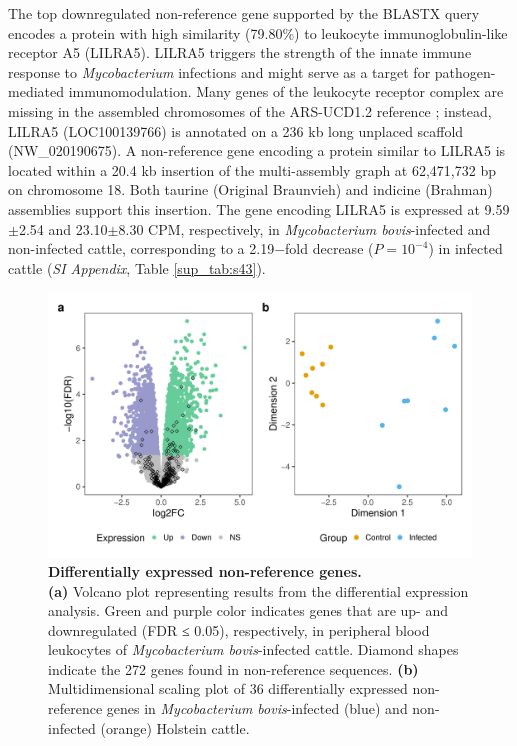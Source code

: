 \documentclass[../main.tex]{subfiles}
\begin{document}
The top downregulated non-reference gene supported by the BLASTX query encodes a protein with high similarity (79.80\%) to leukocyte immunoglobulin-like receptor A5 (LILRA5). LILRA5 triggers the strength of the innate immune response to \emph{Mycobacterium} infections \citep{bah2018meta} and might serve as a target for pathogen-mediated immunomodulation. Many genes of the leukocyte receptor complex are missing in the assembled chromosomes of the ARS-UCD1.2 reference \citep{bakshy2021development}; instead, LILRA5 (LOC100139766) is annotated on a 236 kb long unplaced scaffold (NW\_020190675). A non-reference gene encoding a protein similar to LILRA5 is located within a 20.4 kb insertion of the multi-assembly graph at 62,471,732 bp on chromosome 18. Both taurine (Original Braunvieh) and indicine (Brahman) assemblies support this insertion. The gene encoding LILRA5 is expressed at 9.59$±$2.54 and 23.10$±$8.30 CPM, respectively, in \emph{Mycobacterium bovis}-infected and non-infected cattle, corresponding to a 2.19$-$fold decrease ($P=10^{-4}$) in infected cattle (\emph{SI Appendix}, Table \ref{sup_tab:s43}).

\begin{figure}[!htb]
    \centering
    \includegraphics[width=\textwidth]{paper3/main_figure/Fig4.pdf}
        \caption[Differential expression non-reference genes]{\textbf{Differentially expressed non-reference genes.} \\
        \footnotesize{\textbf{(a)} Volcano plot representing results from the differential expression analysis. Green and purple color indicates genes that are up- and downregulated (FDR ≤ 0.05), respectively, in peripheral blood leukocytes of \emph{Mycobacterium bovis}-infected cattle. Diamond shapes indicate the 272 genes found in non-reference sequences. \textbf{(b)} Multidimensional scaling plot of 36 differentially expressed non-reference genes in \emph{Mycobacterium bovis}-infected (blue) and non-infected (orange) Holstein cattle.}}
        \label{fig44:rnadif}
\end{figure}
\end{document}
